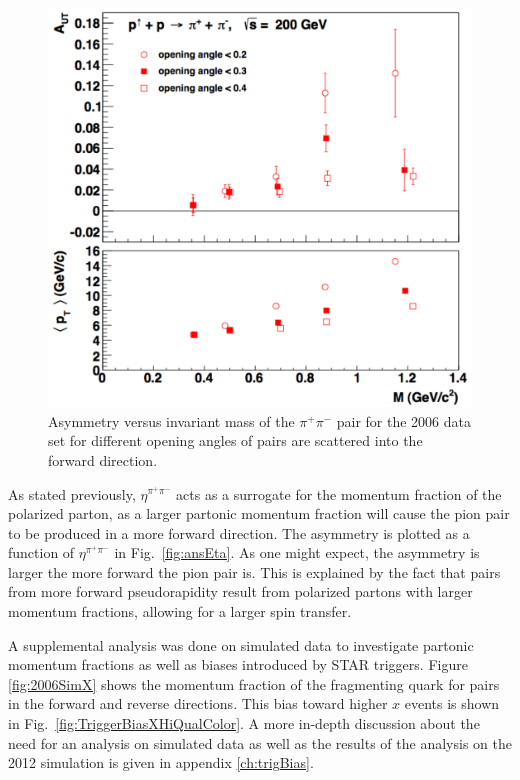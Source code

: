 \documentclass[letterpaper, abstract = on,listof=totoc, bibliography=totoc]{scrreprt}
\newcommand{\etapair}{\eta^{\pi^+\pi^-}}
\newcommand{\pip}{\pi^+}
\newcommand{\pim}{\pi^-}
\newcommand{\pair}{$\pip\pim$ }
\begin{document}
 \begin{figure}
\begin{center}
\includegraphics[width = 1\textwidth]{ansAngles_new}
\caption[$A_{UT}$ for different opening angles]{Asymmetry versus invariant mass of the \pair pair for the 2006 data set for different opening angles of pairs are scattered into the forward direction.}
\label{fig:ansAng}
\end{center}
\end{figure}

As stated previously, $\etapair$ acts as a surrogate for the momentum fraction of the polarized parton, as a larger partonic momentum fraction will cause the pion pair to be produced in a more forward direction. The asymmetry is plotted as a function of $\etapair$ in Fig.~\ref{fig:ansEta}. As one might expect, the asymmetry is larger the more forward the pion pair is. This is explained by the fact that pairs from more forward pseudorapidity result from polarized partons with larger momentum fractions, allowing for a larger spin transfer. 

A supplemental analysis was done on simulated data to investigate partonic momentum fractions as well as biases introduced by STAR triggers. Figure \ref{fig:2006SimX} shows the momentum fraction of the fragmenting quark for pairs in the forward and reverse directions. This bias toward higher $x$ events is shown in Fig.~\ref{fig:TriggerBiasXHiQualColor}. A more in-depth discussion about the need for an analysis on simulated data as well as the results of the analysis on the 2012 simulation is given in appendix \ref{ch:trigBias}.
\end{document}
